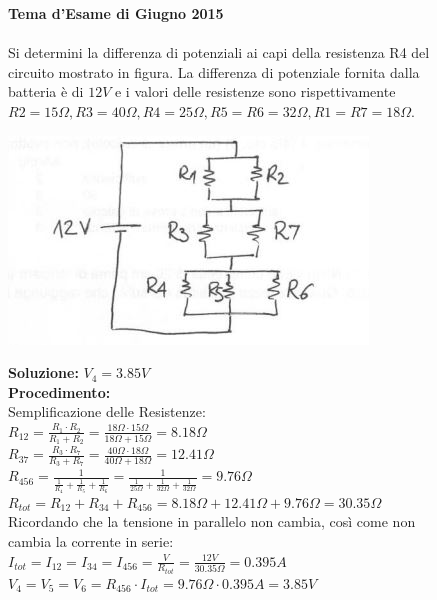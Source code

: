\begin{figure}[h!]
\textbf{Tema d'Esame di Giugno 2015}\\ \\
Si determini la differenza di potenziali ai capi della resistenza R4 del circuito mostrato in figura. La differenza di potenziale fornita dalla batteria è di $12V$ e i valori delle resistenze sono rispettivamente $R2=15\Omega, R3=40\Omega, R4=25\Omega, R5=R6=32\Omega, R1=R7=18\Omega$.
	\begin{center}
		\includegraphics[scale=1]{ES5/GIU052015.jpg}
	\end{center}
	\begin{boxed}
		\null\hfill \textbf{Soluzione:} $V_4 = 3.85 V$\\
		\textbf{Procedimento: } \\
		Semplificazione delle Resistenze:\\
		$R_{12}=\frac{R_1\cdot R_2}{R_1+R_2}=\frac{18\Omega \cdot 15\Omega}{18\Omega+15\Omega}=8.18\Omega$\\
		$R_{37}=\frac{R_3\cdot R_7}{R_3+R_7}=\frac{40\Omega \cdot 18\Omega}{40\Omega+18\Omega}=12.41\Omega$\\
		$R_{456}=\frac{1}{\frac{1}{R_4}+\frac{1}{R_5}+\frac{1}{R_6}}=\frac{1}{\frac{1}{25\Omega}+\frac{1}{32\Omega}+\frac{1}{32\Omega}}=9.76\Omega$\\
		$R_{tot}=R_{12}+R_{34}+R_{456}=8.18\Omega+12.41\Omega+9.76\Omega=30.35\Omega$\\
		Ricordando che la tensione in parallelo non cambia, così come non cambia la corrente in serie:\\
		$I_{tot}=I_{12}=I_{34}=I_{456}=\frac{V}{R_{tot}}=\frac{12V}{30.35\Omega}=0.395A$\\
		$V_4=V_5=V_6=R_{456}\cdot I_{tot}=9.76\Omega\cdot 0.395A=3.85V$
	\end{boxed}
\end{figure}

